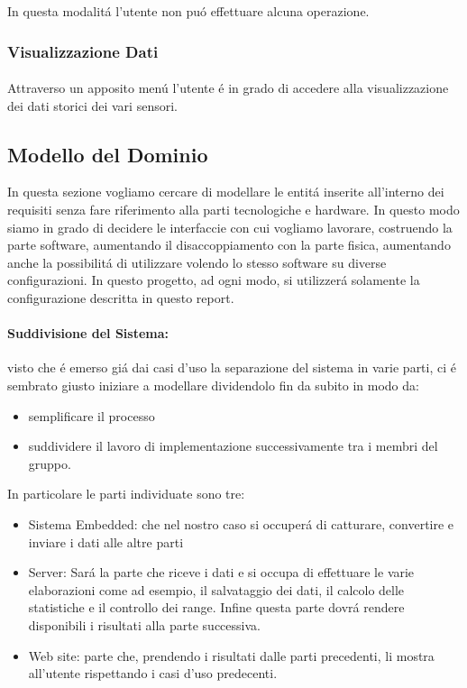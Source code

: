 In questa modalit\'a l'utente non pu\'o effettuare alcuna operazione.

\subsubsection{Visualizzazione Dati}

\paragraph{} Attraverso un apposito men\'u l'utente \'e in grado di accedere alla visualizzazione dei dati storici dei vari sensori.

\subsection{Modello del Dominio}

In questa sezione vogliamo cercare di modellare le entit\'a inserite all'interno dei requisiti senza fare riferimento alla parti tecnologiche e hardware. In questo modo siamo in grado di decidere le interfaccie con cui vogliamo lavorare, costruendo la parte software, aumentando il disaccoppiamento con la parte fisica, aumentando anche la possibilit\'a di utilizzare volendo lo stesso software su diverse configurazioni. In questo progetto, ad ogni modo, si utilizzer\'a solamente la configurazione descritta in questo report.

\paragraph{Suddivisione del Sistema:} visto che \'e emerso gi\'a dai casi d'uso la separazione del sistema in varie parti, ci \'e sembrato giusto iniziare a modellare dividendolo fin da subito in modo da:
\begin{itemize}
  \item semplificare il processo
  \item suddividere il lavoro di implementazione successivamente tra i membri del gruppo.
\end{itemize}

In particolare le parti individuate sono tre:

\begin{itemize}
  \item Sistema Embedded: che nel nostro caso si occuper\'a di catturare, convertire e inviare i dati alle altre parti
  \item Server: Sar\'a la parte che riceve i dati e si occupa di effettuare le varie elaborazioni come ad esempio, il salvataggio dei dati, il calcolo delle statistiche e il controllo dei range. Infine questa parte dovr\'a rendere disponibili i risultati alla parte successiva.
  \item Web site: parte che, prendendo i risultati dalle parti precedenti, li mostra all'utente rispettando i casi d'uso predecenti.
\end{itemize}


